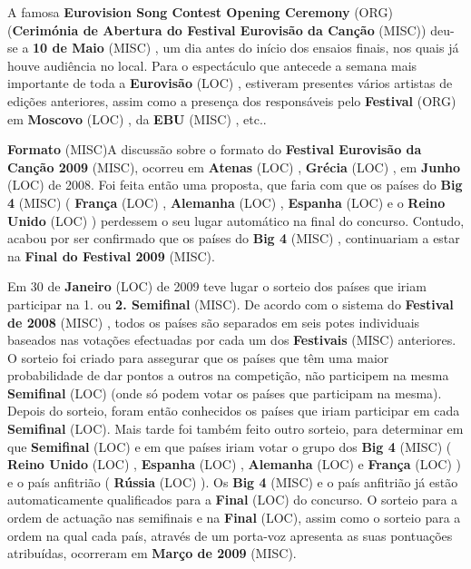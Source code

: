 \documentclass[12pt,a4paper]{article}
\begin{document}
A famosa \textbf{Eurovision Song Contest Opening Ceremony} (ORG) (\textbf{Cerimónia de Abertura do Festival Eurovisão da Canção} (MISC)) deu-se a \textbf{10 de Maio} (MISC) , um dia antes do início dos ensaios finais, nos quais já houve audiência no local. Para o espectáculo que antecede a semana mais importante de toda a \textbf{Eurovisão} (LOC) , estiveram presentes vários artistas de edições anteriores, assim como a presença dos responsáveis pelo \textbf{Festival} (ORG) em \textbf{Moscovo} (LOC) , da \textbf{EBU} (MISC) , etc..



\textbf{Formato} (MISC)A discussão sobre o formato do \textbf{Festival Eurovisão da Canção 2009} (MISC), ocorreu em \textbf{Atenas} (LOC) , \textbf{Grécia} (LOC) , em \textbf{Junho} (LOC) de 2008. Foi feita então uma proposta, que faria com que os países do \textbf{Big 4} (MISC) ( \textbf{França} (LOC) , \textbf{Alemanha} (LOC) , \textbf{Espanha} (LOC) e o \textbf{Reino Unido} (LOC) ) perdessem o seu lugar automático na final do concurso. Contudo, acabou por ser confirmado que os países do \textbf{Big 4} (MISC) , continuariam a estar na \textbf{Final do Festival 2009} (MISC).

Em 30 de \textbf{Janeiro} (LOC) de 2009 teve lugar o sorteio dos países que iriam participar na 1. ou \textbf{2. Semifinal} (MISC). De acordo com o sistema do \textbf{Festival de 2008} (MISC) , todos os países são separados em seis potes individuais baseados nas votações efectuadas por cada um dos \textbf{Festivais} (MISC) anteriores. O sorteio foi criado para assegurar que os países que têm uma maior probabilidade de dar pontos a outros na competição, não participem na mesma \textbf{Semifinal} (LOC) (onde só podem votar os países que participam na mesma). Depois do sorteio, foram então conhecidos os países que iriam participar em cada \textbf{Semifinal} (LOC). Mais tarde foi também feito outro sorteio, para determinar em que \textbf{Semifinal} (LOC) e em que países iriam votar o grupo dos \textbf{Big 4} (MISC) ( \textbf{Reino Unido} (LOC) , \textbf{Espanha} (LOC) , \textbf{Alemanha} (LOC) e \textbf{França} (LOC) ) e o país anfitrião ( \textbf{Rússia} (LOC) ). Os \textbf{Big 4} (MISC) e o país anfitrião já estão automaticamente qualificados para a \textbf{Final} (LOC) do concurso. O sorteio para a ordem de actuação nas semifinais e na \textbf{Final} (LOC), assim como o sorteio para a ordem na qual cada país, através de um porta-voz apresenta as suas pontuações atribuídas, ocorreram em \textbf{Março de 2009} (MISC).
\end{document}

